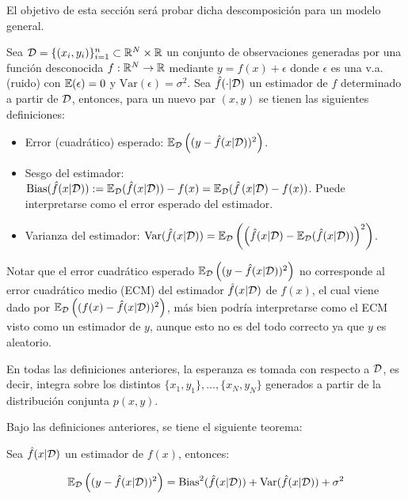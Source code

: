 El objetivo de esta sección será probar dicha descomposición para un modelo general.



\begin{definition}
	Sea ${\mathcal D}=\{(x_i,y_i)\}_{i=1}^n\subset\mathbb{R}^N\times\mathbb{R}$ un conjunto de observaciones generadas por una función desconocida $f:\mathbb{R}^N\to\mathbb{R}$ mediante $y=f(x)+\epsilon$ donde $\epsilon$ es una v.a. (ruido) con $\operatorname{\mathbb{E}}(\epsilon)=0$ y $\text{Var}(\epsilon)=\sigma^2$. Sea $\hat{f}(\cdot|{\mathcal D})$ un estimador de $f$ determinado a partir de ${\mathcal D}$, entonces, para un nuevo par $(x,y)$ se tienen las siguientes definiciones:
	
	\begin{itemize}
		\item Error (cuadrático) esperado: $\operatorname{\mathbb{E}}_{\mathcal D}\left((y-\hat{f}(x|{\mathcal D}))^2\right)$.
		\item Sesgo del estimador: $\text{Bias}(\hat{f}(x|{\mathcal D})):= \operatorname{\mathbb{E}}_{\mathcal D}(\hat{f}(x|{\mathcal D})) - f(x) = \operatorname{\mathbb{E}}_{\mathcal D}(\hat{f}\left(x|{\mathcal D}) - f(x)\right)$. Puede interpretarse como el error esperado del estimador.
		\item Varianza del estimador: $\text{Var}(\hat{f}(x|{\mathcal D})) = \operatorname{\mathbb{E}}_{\mathcal D}\left(\left(\hat{f}(x|{\mathcal D})-\operatorname{\mathbb{E}}_{\mathcal D}(\hat{f}(x|{\mathcal D}))\right)^2\right)$.
		
	\end{itemize}
\end{definition}

\begin{remark}
Notar que el error cuadrático esperado $\operatorname{\mathbb{E}}_{\mathcal D}\left((y-\hat{f}(x|{\mathcal D}))^2\right)$ no corresponde al error cuadrático medio (ECM) del estimador $\hat{f}(x|{\mathcal D})$ de $f(x)$, el cual viene dado por $\operatorname{\mathbb{E}}_{\mathcal D}\left((f(x)-\hat{f}(x|{\mathcal D}))^2\right)$, más bien podría interpretarse como el ECM visto como un estimador de $y$, aunque esto no es del todo correcto ya que $y$ es aleatorio.
\end{remark}

\begin{remark}
	En todas las definiciones anteriores, la esperanza es tomada con respecto a ${\mathcal D}$, es decir, integra sobre los distintos $\{x_1,y_1\},\ldots,\{x_N,y_N\}$ generados a partir de la distribución conjunta $p(x,y)$.
\end{remark}


Bajo las definiciones anteriores, se tiene el siguiente teorema:

\begin{theorem} Sea $\hat{f}(x|{\mathcal D})$ un estimador de $f(x)$, entonces:

\begin{equation}
	\operatorname{\mathbb{E}}_{\mathcal D}\left((y-\hat{f}(x|{\mathcal D}))^2\right) = \text{Bias}^2(\hat{f}(x|{\mathcal D})) + \text{Var}(\hat{f}(x|{\mathcal D})) + \sigma^2
\end{equation}
	
\end{theorem}

